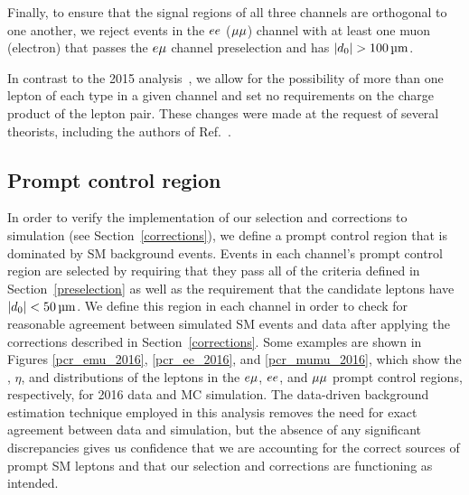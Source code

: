 Finally, to ensure that the signal regions of all three channels are orthogonal to one another, we reject events in the $ee$ (${\mu}{\mu}$) channel with at least one muon (electron) that passes the $e{\mu}$ channel preselection and has $\ad>\SI{100}{\um}$.

In contrast to the 2015 analysis~\cite{CMS:DisplacedEMu}, we allow for the possibility of more than one lepton of each type in a given channel and set no requirements on the charge product of the lepton pair. These changes were made at the request of several theorists, including the authors of Ref.~\cite{Evans:2016zau}.

\subsection{Prompt control region}
\label{pcr}
In order to verify the implementation of our selection and corrections to simulation (see Section~\ref{corrections}), we define a prompt control region that is dominated by SM background events. Events in each channel's prompt control region are selected by requiring that they pass all of the criteria defined in Section~\ref{preselection} as well as the requirement that the candidate leptons have $\ad<\SI{50}{\um}$. We define this region in each channel in order to check for reasonable agreement between simulated SM events and data after applying the corrections described in Section~\ref{corrections}. Some examples are shown in Figures \ref{pcr_emu_2016}, \ref{pcr_ee_2016}, and \ref{pcr_mumu_2016}, which show the \pt, $\eta$, and \ad distributions of the leptons in the $e{\mu}$, $ee$, and ${\mu}{\mu}$ prompt control regions, respectively, for 2016 data and MC simulation. The data-driven background estimation technique employed in this analysis removes the need for exact agreement between data and simulation, but the absence of any significant discrepancies gives us confidence that we are accounting for the correct sources of prompt SM leptons and that our selection and corrections are functioning as intended.






